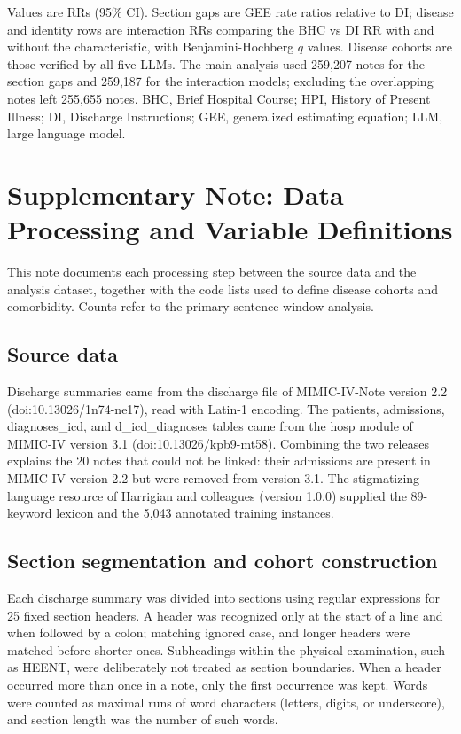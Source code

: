 \documentclass[unnumsec,webpdf,contemporary,large]{oup-authoring-template}
\begin{document}
\begin{table}[H]
\begin{tablenotes}
\item Values are RRs (95\% CI). Section gaps are GEE rate ratios relative to DI; disease and identity rows are interaction RRs comparing the BHC vs DI RR with and without the characteristic, with Benjamini-Hochberg $q$ values. Disease cohorts are those verified by all five LLMs. The main analysis used 259,207 notes for the section gaps and 259,187 for the interaction models; excluding the overlapping notes left 255,655 notes. BHC, Brief Hospital Course; HPI, History of Present Illness; DI, Discharge Instructions; GEE, generalized estimating equation; LLM, large language model.
\end{tablenotes}
\end{table}

\section{Supplementary Note: Data Processing and Variable Definitions}
\label{sec:s_processing}

This note documents each processing step between the source data and the analysis dataset, together with the code lists used to define disease cohorts and comorbidity. Counts refer to the primary sentence-window analysis.

\subsection{Source data}

Discharge summaries came from the discharge file of MIMIC-IV-Note version 2.2 (doi:10.13026/1n74-ne17), read with Latin-1 encoding. The patients, admissions, diagnoses\_icd, and d\_icd\_diagnoses tables came from the hosp module of MIMIC-IV version 3.1 (doi:10.13026/kpb9-mt58). Combining the two releases explains the 20 notes that could not be linked: their admissions are present in MIMIC-IV version 2.2 but were removed from version 3.1.
The stigmatizing-language resource of Harrigian and colleagues (version 1.0.0) supplied the 89-keyword lexicon and the 5,043 annotated training instances.

\subsection{Section segmentation and cohort construction}

Each discharge summary was divided into sections using regular expressions for 25 fixed section headers. A header was recognized only at the start of a line and when followed by a colon; matching ignored case, and longer headers were matched before shorter ones. Subheadings within the physical examination, such as HEENT, were deliberately not treated as section boundaries. When a header occurred more than once in a note, only the first occurrence was kept. Words were counted as maximal runs of word characters (letters, digits, or underscore), and section length was the number of such words.
\end{document}
